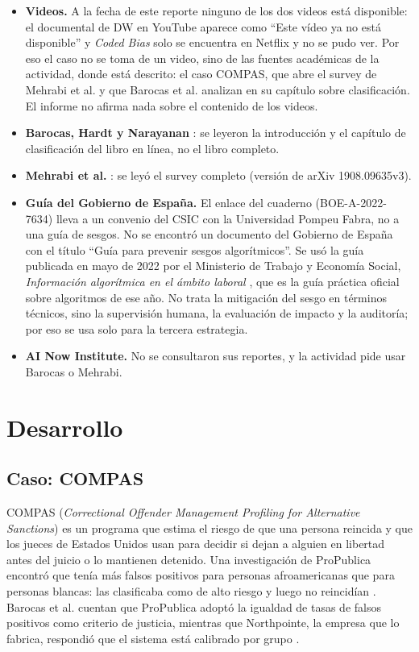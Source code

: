 \documentclass[11pt,letterpaper]{article}
\begin{document}
\begin{itemize}
    \item \textbf{Videos.} A la fecha de este reporte ninguno de los dos videos está disponible: el documental de DW en YouTube aparece como ``Este vídeo ya no está disponible'' y \textit{Coded Bias} solo se encuentra en Netflix y no se pudo ver. Por eso el caso no se toma de un video, sino de las fuentes académicas de la actividad, donde está descrito: el caso COMPAS, que abre el survey de Mehrabi et al. y que Barocas et al. analizan en su capítulo sobre clasificación. El informe no afirma nada sobre el contenido de los videos.
    \item \textbf{Barocas, Hardt y Narayanan} \parencite{barocas2023}: se leyeron la introducción y el capítulo de clasificación del libro en línea, no el libro completo.
    \item \textbf{Mehrabi et al.} \parencite{mehrabi2021}: se leyó el survey completo (versión de arXiv 1908.09635v3).
    \item \textbf{Guía del Gobierno de España.} El enlace del cuaderno (BOE-A-2022-7634) lleva a un convenio del CSIC con la Universidad Pompeu Fabra, no a una guía de sesgos. No se encontró un documento del Gobierno de España con el título ``Guía para prevenir sesgos algorítmicos''. Se usó la guía publicada en mayo de 2022 por el Ministerio de Trabajo y Economía Social, \textit{Información algorítmica en el ámbito laboral} \parencite{mites2022}, que es la guía práctica oficial sobre algoritmos de ese año. No trata la mitigación del sesgo en términos técnicos, sino la supervisión humana, la evaluación de impacto y la auditoría; por eso se usa solo para la tercera estrategia.
    \item \textbf{AI Now Institute.} No se consultaron sus reportes, y la actividad pide usar Barocas o Mehrabi.
\end{itemize}

\section{Desarrollo}

\subsection{Caso: COMPAS}

COMPAS (\textit{Correctional Offender Management Profiling for Alternative Sanctions}) es un programa que estima el riesgo de que una persona reincida y que los jueces de Estados Unidos usan para decidir si dejan a alguien en libertad antes del juicio o lo mantienen detenido. Una investigación de ProPublica encontró que tenía más falsos positivos para personas afroamericanas que para personas blancas: las clasificaba como de alto riesgo y luego no reincidían \parencite{mehrabi2021}. Barocas et al. cuentan que ProPublica adoptó la igualdad de tasas de falsos positivos como criterio de justicia, mientras que Northpointe, la empresa que lo fabrica, respondió que el sistema está calibrado por grupo \parencite{barocas2023}.
\end{document}
